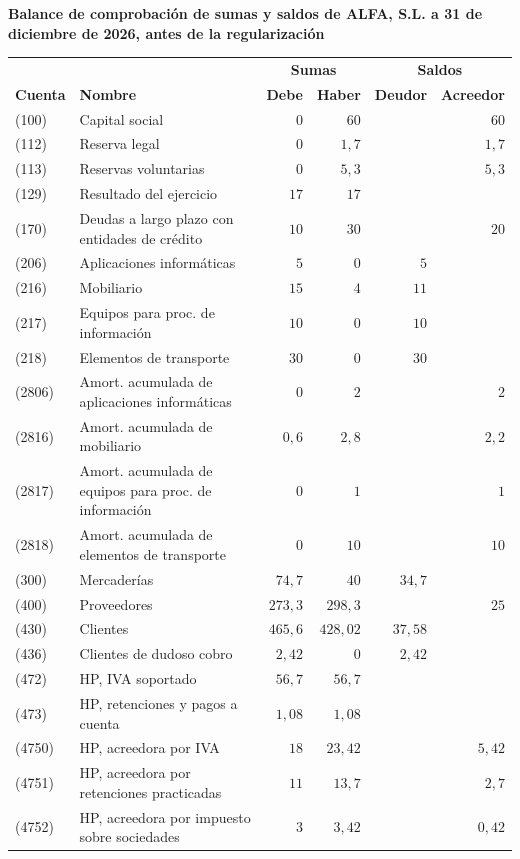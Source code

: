 \documentclass[10pt,a4paper]{article}
\begin{document}
\begin{center}\begin{minipage}{\linewidth}\centering
{\small\textbf{Balance de comprobación de sumas y saldos de ALFA, S.L. a 31 de diciembre de 2026, antes de la regularización}}\par\vspace{0.3em}
{\footnotesize
\begin{tabular}{l p{6.6cm} r r r r}
\hline
& & \multicolumn{2}{c}{\textbf{Sumas}} & \multicolumn{2}{c}{\textbf{Saldos}} \\
\textbf{Cuenta} & \textbf{Nombre} & \textbf{Debe} & \textbf{Haber} & \textbf{Deudor} & \textbf{Acreedor} \\
\hline
(100) & \raggedright Capital social & $0$ & $60$ &  & $60$ \tabularnewline
(112) & \raggedright Reserva legal & $0$ & $1,7$ &  & $1,7$ \tabularnewline
(113) & \raggedright Reservas voluntarias & $0$ & $5,3$ &  & $5,3$ \tabularnewline
(129) & \raggedright Resultado del ejercicio & $17$ & $17$ &  &  \tabularnewline
(170) & \raggedright Deudas a largo plazo con entidades de crédito & $10$ & $30$ &  & $20$ \tabularnewline
(206) & \raggedright Aplicaciones informáticas & $5$ & $0$ & $5$ &  \tabularnewline
(216) & \raggedright Mobiliario & $15$ & $4$ & $11$ &  \tabularnewline
(217) & \raggedright Equipos para proc. de información & $10$ & $0$ & $10$ &  \tabularnewline
(218) & \raggedright Elementos de transporte & $30$ & $0$ & $30$ &  \tabularnewline
(2806) & \raggedright Amort. acumulada de aplicaciones informáticas & $0$ & $2$ &  & $2$ \tabularnewline
(2816) & \raggedright Amort. acumulada de mobiliario & $0,6$ & $2,8$ &  & $2,2$ \tabularnewline
(2817) & \raggedright Amort. acumulada de equipos para proc. de información & $0$ & $1$ &  & $1$ \tabularnewline
(2818) & \raggedright Amort. acumulada de elementos de transporte & $0$ & $10$ &  & $10$ \tabularnewline
(300) & \raggedright Mercaderías & $74,7$ & $40$ & $34,7$ &  \tabularnewline
(400) & \raggedright Proveedores & $273,3$ & $298,3$ &  & $25$ \tabularnewline
(430) & \raggedright Clientes & $465,6$ & $428,02$ & $37,58$ &  \tabularnewline
(436) & \raggedright Clientes de dudoso cobro & $2,42$ & $0$ & $2,42$ &  \tabularnewline
(472) & \raggedright HP, IVA soportado & $56,7$ & $56,7$ &  &  \tabularnewline
(473) & \raggedright HP, retenciones y pagos a cuenta & $1,08$ & $1,08$ &  &  \tabularnewline
(4750) & \raggedright HP, acreedora por IVA & $18$ & $23,42$ &  & $5,42$ \tabularnewline
(4751) & \raggedright HP, acreedora por retenciones practicadas & $11$ & $13,7$ &  & $2,7$ \tabularnewline
(4752) & \raggedright HP, acreedora por impuesto sobre sociedades & $3$ & $3,42$ &  & $0,42$ \tabularnewline

\end{tabular}}
\end{minipage}
\end{center}
\end{document}
